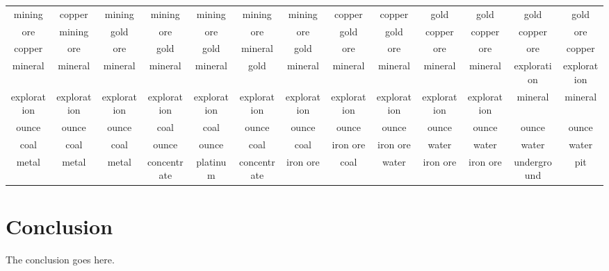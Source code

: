 \documentclass[12pt,journal,letterpaper,oneside,onecolumn]{IEEEtran}
\begin{document}
\begin{table}[!ht]
{\begin{tabular}{c|c|c|c|c|c|c|c|c|c|c|c|c}
mining & copper & mining & mining & mining & mining & mining & copper & copper & gold & gold & gold & gold \\ 
ore & mining & gold & ore & ore & ore & ore & gold & gold & copper & copper & copper & ore \\ 
copper & ore & ore & gold & gold & mineral & gold & ore & ore & ore & ore & ore & copper \\ 
mineral & mineral & mineral & mineral & mineral & gold & mineral & mineral & mineral & mineral & mineral & exploration & exploration \\ 
exploration & exploration & exploration & exploration & exploration & exploration & exploration & exploration & exploration & exploration & exploration & mineral & mineral \\ 
ounce & ounce & ounce & coal & coal & ounce & ounce & ounce & ounce & ounce & ounce & ounce & ounce \\ 
coal & coal & coal & ounce & ounce & coal & coal & iron ore & iron ore & water & water & water & water \\ 
metal & metal & metal & concentrate & platinum & concentrate & iron ore & coal & water & iron ore & iron ore & underground & pit \\ 
    \end{tabular}
    }
\end{table}

\section{Conclusion}
The conclusion goes here.
\end{document}
